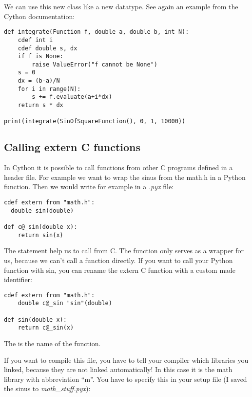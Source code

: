 \documentclass[letterpaper,10pt,english]{manual}
\begin{document}
We can use this new class like a new datatype.
See again an example from the Cython documentation:

\begin{Verbatim}[commandchars=@\[\]]
def integrate(Function f, double a, double b, int N):
    cdef int i
    cdef double s, dx
    if f is None:
        raise ValueError("f cannot be None")
    s = 0
    dx = (b-a)/N
    for i in range(N):
        s += f.evaluate(a+i*dx)
    return s * dx

print(integrate(SinOfSquareFunction(), 0, 1, 10000))
\end{Verbatim}


\subsection{Calling extern C functions}

In Cython it is possible to call functions from other C programs
defined in a header file. For example we want to wrap the sinus from
the math.h in a Python function. Then we would write for example in a
\emph{.pyx} file:

\begin{Verbatim}[commandchars=@\[\]]
cdef extern from "math.h":
  double sin(double)

def c@_sin(double x):
    return sin(x)
\end{Verbatim}

The  statement help us to call  from C.
The  function only serves as a wrapper for us, because we
can't call a  function directly. If you want to call your
Python function with sin, you can rename the extern C function with
a custom made identifier:

\begin{Verbatim}[commandchars=@\[\]]
cdef extern from "math.h":
    double c@_sin "sin"(double)

def sin(double x):
    return c@_sin(x)
\end{Verbatim}

The  is the name of the  function.

If you want to compile this file, you have to tell your compiler which
libraries you linked, because they are not linked automatically! In
this case it is the math library with abbreviation ``m''. You have to
specify this in your setup file (I saved the sinus to \emph{math\_stuff.pyx}):
\end{document}
